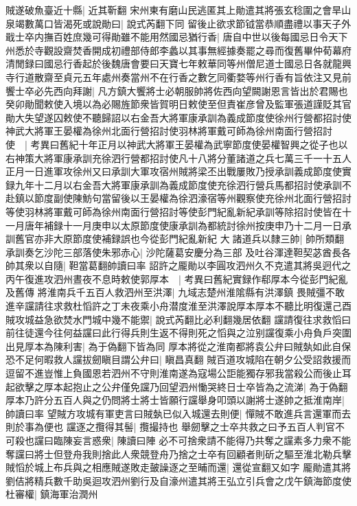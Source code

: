 賊遂破魚臺近十縣|{
	近其靳翻}
宋州東有磨山民逃匿其上勛遣其將張玄稔圍之會旱山泉竭數萬口皆渴死或說勛曰|{
	說式芮翻下同}
留後止欲求節钺當恭順盡禮以事天子外戢士卒内撫百姓庶幾可得勛雖不能用然國忌猶行香|{
	唐自中世以後每國忌日令天下州悉於寺觀設齋焚香開成初禮部侍郎李蠡以其事無經據奏罷之尋而復舊畢仲荀幕府清閒録曰國忌行香起於後魏唐會要曰天寶七年敕華同等州僧尼道士國忌日各就龍興寺行道散齋至貞元五年處州奏當州不在行香之數乞同衢婺等州行香有旨依注又見前}
饗士卒必先西向拜謝|{
	凡方鎮大饗將士必朝服帥將佐西向望闕謝恩言皆出於君賜也}
癸卯勛聞敕使入境以為必賜旌節衆皆賀明日敕使至但責崔彦曾及監軍張道謹貶其官勛大失望遂囚敕使不聽歸詔以右金吾大將軍康承訓為義成節度使徐州行營都招討使神武大將軍王晏權為徐州北面行營招討使羽林將軍戴可師為徐州南面行營招討使　|{
	考異曰舊紀十年正月以神武大將軍王晏權為武寧節度使晏權智興之從子也以右神策大將軍康承訓充徐泗行營都招討使凡十八將分董諸道之兵七萬三千一十五人正月一日進軍攻徐州又曰承訓大軍攻宿州賊將梁丕出戰屢敗乃授承訓義成節度使實録九年十二月以右金吾大將軍康承訓為義成節度使充徐泗行營兵馬都招討使承訓不赴鎮以節度副使陳魴句當留後以王晏權為徐泗濠宿等州觀察使充徐州北面行營招討等使羽林將軍戴可師為徐州南面行營招討等使彭門紀亂新紀承訓等除招討使皆在十一月唐年補録十一月庚申以太原節度使康承訓為都統討徐州按庚申乃十二月一日承訓舊官亦非大原節度使補録誤也今從彭門紀亂新紀}
大諸道兵以隸三帥|{
	帥所類翻}
承訓奏乞沙陀三部落使朱邪赤心|{
	沙陀薩葛安慶分為三部}
及吐谷渾達靼契苾酋長各帥其衆以自隨|{
	靼當葛翻帥讀曰率}
詔許之龎勛以李圓攻泗州久不克遣其將吳迥代之丙午復進攻泗州晝夜不息時敕使郭厚本　|{
	考異曰舊紀實録作郗厚本今從彭門紀亂及舊傳}
將淮南兵千五百人救泗州至洪澤|{
	九域志楚州淮隂縣有洪澤鎮}
畏賊彊不敢進辛讜請往求救杜慆許之丁未夜乘小舟潜度淮至洪澤說厚本厚本不聽比明復還己酉賊攻城益急欲焚水門城中幾不能禦|{
	說式芮翻比必利翻幾居依翻}
讜請復往求救慆曰前往徒還今往何益讜曰此行得兵則生返不得則死之慆與之泣别讜復乘小舟負戶突圍出見厚本為陳利害|{
	為于偽翻下皆為同}
厚本將從之淮南都將袁公弁曰賊埶如此自保恐不足何暇救人讜拔劒瞋目謂公弁曰|{
	瞋昌真翻}
賊百道攻城陷在朝夕公受詔救援而逗留不進豈惟上負國恩若泗州不守則淮南遂為寇場公詎能獨存邪我當殺公而後止耳起欲擊之厚本起抱止之公弁僅免讜乃回望泗州慟哭終日士卒皆為之流涕|{
	為于偽翻}
厚本乃許分五百人與之仍問將士將士皆願行讜舉身叩頭以謝將士遂帥之抵淮南岸|{
	帥讀曰率}
望賊方攻城有軍吏言曰賊埶已似入城還去則便|{
	憚賊不敢進兵言還軍而去則於事為便也}
讜逐之攬得其髻|{
	攬撮持也}
舉劒擊之士卒共救之曰予五百人判官不可殺也讜曰臨陳妄言惑衆|{
	陳讀曰陣}
必不可捨衆請不能得乃共奪之讜素多力衆不能奪讜曰將士但登舟我則捨此人衆競登舟乃捨之士卒有回顧者則斫之驅至淮北勒兵擊賊慆於城上布兵與之相應賊遂敗走皷譟逐之至晡而還|{
	還從宣翻又如字}
龎勛遣其將劉佶將精兵數千助吳迴攻泗州劉行及自濠州遣其將王弘立引兵會之戊午鎮海節度使杜審權|{
	鎮海軍治潤州}
